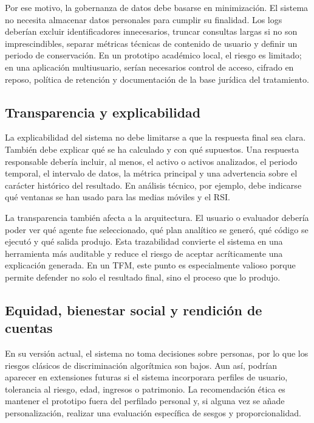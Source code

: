 \documentclass{article}
\begin{document}
Por ese motivo, la gobernanza de datos debe basarse en minimización. El sistema no necesita almacenar datos personales para cumplir su finalidad. Los logs deberían excluir identificadores innecesarios, truncar consultas largas si no son imprescindibles, separar métricas técnicas de contenido de usuario y definir un periodo de conservación. En un prototipo académico local, el riesgo es limitado; en una aplicación multiusuario, serían necesarios control de acceso, cifrado en reposo, política de retención y documentación de la base jurídica del tratamiento.

\subsection{Transparencia y explicabilidad}

La explicabilidad del sistema no debe limitarse a que la respuesta final sea clara. También debe explicar qué se ha calculado y con qué supuestos. Una respuesta responsable debería incluir, al menos, el activo o activos analizados, el periodo temporal, el intervalo de datos, la métrica principal y una advertencia sobre el carácter histórico del resultado. En análisis técnico, por ejemplo, debe indicarse qué ventanas se han usado para las medias móviles y el RSI.

La transparencia también afecta a la arquitectura. El usuario o evaluador debería poder ver qué agente fue seleccionado, qué plan analítico se generó, qué código se ejecutó y qué salida produjo. Esta trazabilidad convierte el sistema en una herramienta más auditable y reduce el riesgo de aceptar acríticamente una explicación generada. En un TFM, este punto es especialmente valioso porque permite defender no solo el resultado final, sino el proceso que lo produjo.

\subsection{Equidad, bienestar social y rendición de cuentas}

En su versión actual, el sistema no toma decisiones sobre personas, por lo que los riesgos clásicos de discriminación algorítmica son bajos. Aun así, podrían aparecer en extensiones futuras si el sistema incorporara perfiles de usuario, tolerancia al riesgo, edad, ingresos o patrimonio. La recomendación ética es mantener el prototipo fuera del perfilado personal y, si alguna vez se añade personalización, realizar una evaluación específica de sesgos y proporcionalidad.
\end{document}
